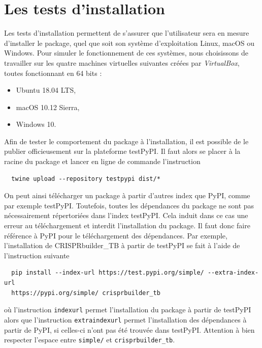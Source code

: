 \documentclass[twoside,a4paper,11pt,frenchb,openany]{report}
\begin{document}
\section{Les tests d'installation}

Les tests d'installation permettent de s'assurer que l'utilisateur sera en mesure d'installer le package, quel que soit son système d'exploitation Linux, macOS ou Windows. Pour simuler le fonctionnement de ces systèmes, nous choisissons de travailler sur les quatre machines virtuelles suivantes créées par \textit{VirtualBox}, toutes fonctionnant en 64 bits : 
\begin{itemize}
\item Ubuntu 18.04 LTS, 
\item macOS 10.12 Sierra, 
\item Windows 10.
\end{itemize}

Afin de tester le comportement du package à l'installation, il est possible de le publier officieusement sur la plateforme testPyPI. Il faut alors se placer à la racine du package et lancer en ligne de commande l'instruction
\begin{verbatim}  twine upload --repository testpypi dist/*\end{verbatim}

On peut ainsi télécharger un package à partir d'autres index que PyPI, comme par exemple testPyPI. Toutefois, toutes les dépendances du package ne sont pas nécessairement répertoriées dans l'index testPyPI. Cela induit dans ce cas une erreur au téléchargement et interdit l'installation du package. Il faut donc faire référence à PyPI pour le téléchargement des dépendances. Par exemple, l'installation de CRISPRbuilder\_TB à partir de testPyPI se fait à l'aide de l'instruction suivante

\begin{verbatim}  pip install --index-url https://test.pypi.org/simple/ --extra-index-url 
  https://pypi.org/simple/ crisprbuilder_tb\end{verbatim} 

où l'instruction \texttt{\textemdash \textemdash index\textemdash url} permet l'installation du package à partir de testPyPI alors que l'instruction \texttt{\textemdash \textemdash extra\textemdash index\textemdash url} permet l'installation des dépendances à partir de PyPI, si celles-ci n'ont pas été trouvée dans testPyPI. Attention à bien respecter l'espace entre \texttt{simple/} et \texttt{crisprbuilder\_tb}.
\end{document}
